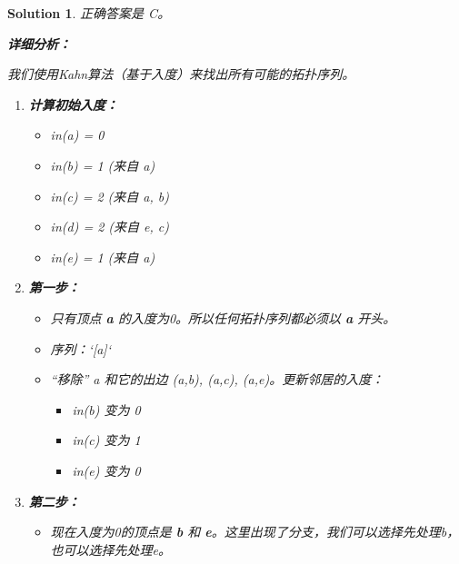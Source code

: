 \documentclass[UTF8]{report}
\newtheorem{solution}{Solution}
\theoremstyle{MyLineTheoremStyle} %
\theoremstyle{MyBlockTheoremStyle} %
\theoremstyle{MySubsubsectionStyle} %
\begin{document}
\begin{solution}
正确答案是 C。

\textbf{详细分析：}

我们使用Kahn算法（基于入度）来找出所有可能的拓扑序列。

\begin{enumerate}
    \item \textbf{计算初始入度：}
    \begin{itemize}
        \item in(a) = 0
        \item in(b) = 1 (来自 a)
        \item in(c) = 2 (来自 a, b)
        \item in(d) = 2 (来自 e, c)
        \item in(e) = 1 (来自 a)
    \end{itemize}

    \item \textbf{第一步：}
    \begin{itemize}
        \item 只有顶点 \textbf{a} 的入度为0。所以任何拓扑序列都必须以 \textbf{a} 开头。
        \item 序列：`[a]`
        \item “移除” a 和它的出边 (a,b), (a,c), (a,e)。更新邻居的入度：
        \begin{itemize}
            \item in(b) 变为 0
            \item in(c) 变为 1
            \item in(e) 变为 0
        \end{itemize}
    \end{itemize}

    \item \textbf{第二步：}
    \begin{itemize}
        \item 现在入度为0的顶点是 \textbf{b} 和 \textbf{e}。这里出现了分支，我们可以选择先处理b，也可以选择先处理e。
    \end{itemize}


\end{enumerate}
\end{solution}
\end{document}
